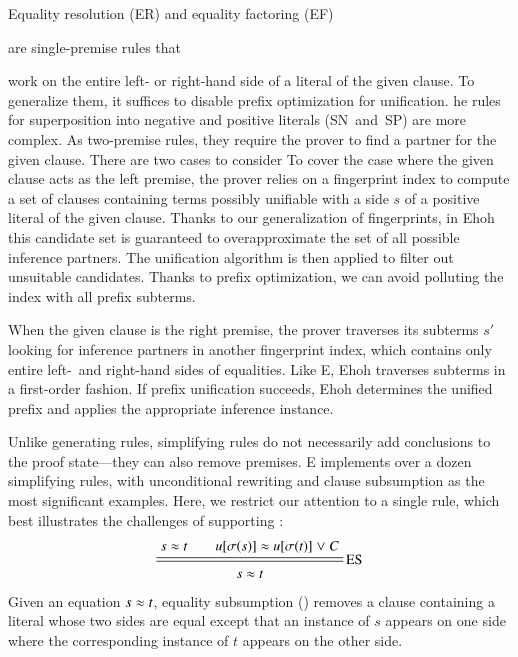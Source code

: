 Equality resolution (ER) and equality factoring (EF) \begin{rep}are single-premise rules
that \end{rep}work on the entire left- or right-hand side of a literal of
the given clause. To generalize them, it suffices to disable prefix
optimization for unification.
%
he rules for superposition into negative and positive literals (SN~and~SP) are more
complex. As two-premise rules, they require the prover to find a partner
for the given clause. There are two cases to consider
%
To cover the case where the given clause acts as the left premise, the prover
relies on a fingerprint index to compute a set of clauses containing terms
possibly unifiable with a side $s$ of a positive literal of the given clause.
Thanks to our generalization of fingerprints, in Ehoh this candidate set is
guaranteed to overapproximate the set of all possible inference partners. The
unification algorithm is then applied to filter out unsuitable candidates.
Thanks to prefix optimization, we can avoid polluting the
index with all prefix subterms.

When the given clause is the right premise, the prover traverses
its subterms $s'$ looking for inference partners in another fingerprint index,
which contains only entire left-~and right-hand sides of equalities. Like E,
Ehoh traverses subterms in a first-order fashion. If prefix unification
succeeds, Ehoh determines the unified prefix and applies the appropriate
inference instance.


Unlike generating rules, simplifying rules do not necessarily add
conclusions to the proof state---they can also remove premises. E
implements over a dozen simplifying rules, with unconditional
rewriting and clause subsumption as the most significant
examples. Here, we restrict our attention to a single rule, which best illustrates
the challenges of supporting \lfhol:
%
\[\namedsimp{ES}{s \eq t \qquad u[\sigma(s)] \eq u[\sigma(t)] \mathrel\vee C}{s \eq t}\]
%
Given an equation $s \approx t$, equality subsumption () removes a clause
containing a literal whose two sides are equal except that an instance of $s$
appears on one side where the corresponding instance of $t$ appears on the
other side.

